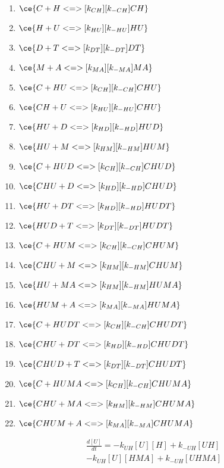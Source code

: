 \begin{enumerate}
\item $\ce{C + H <=>[k_{CH}][k_{-CH}] CH}$ %
\item $\ce{H + U <=>[k_{HU}][k_{-HU}] HU}$ %
\item $\ce{D + T <=>[k_{DT}][k_{-DT}] DT}$ %
\item $\ce{M + A <=>[k_{MA}][k_{-MA}] MA}$ %

\item $\ce{C + HU <=>[k_{CH}][k_{-CH}] CHU}$ %
\item $\ce{CH + U <=>[k_{HU}][k_{-HU}] CHU}$ %
\item $\ce{HU + D <=>[k_{HD}][k_{-HD}] HUD}$ %
\item $\ce{HU + M <=>[k_{HM}][k_{-HM}] HUM}$ %

\item $\ce{C + HUD <=>[k_{CH}][k_{-CH}] CHUD}$ %
\item $\ce{CHU + D <=>[k_{HD}][k_{-HD}] CHUD}$ %
\item $\ce{HU + DT <=>[k_{HD}][k_{-HD}] HUDT}$ %
\item $\ce{HUD + T <=>[k_{DT}][k_{-DT}] HUDT}$ %
\item $\ce{C + HUM <=>[k_{CH}][k_{-CH}] CHUM}$ %
\item $\ce{CHU + M <=>[k_{HM}][k_{-HM}] CHUM}$ %
\item $\ce{HU + MA <=>[k_{HM}][k_{-HM}] HUMA}$ %
\item $\ce{HUM + A <=>[k_{MA}][k_{-MA}] HUMA}$ %

\item $\ce{C + HUDT <=>[k_{CH}][k_{-CH}] CHUDT}$ %
\item $\ce{CHU + DT <=>[k_{HD}][k_{-HD}] CHUDT}$ %
\item $\ce{CHUD + T <=>[k_{DT}][k_{-DT}] CHUDT}$ %
\item $\ce{C + HUMA <=>[k_{CH}][k_{-CH}] CHUMA}$ %
\item $\ce{CHU + MA <=>[k_{HM}][k_{-HM}] CHUMA}$ %
\item $\ce{CHUM + A <=>[k_{MA}][k_{-MA}] CHUMA}$ %
\end{enumerate}

\begin{equation}
\begin{split}
\frac{d[U]}{dt} = - k_{UH}[U][H] + k_{-UH}[UH] \\%
                  - k_{UH}[U][HMA] + k_{-UH}[UHMA] \\%
\end{split}
\end{equation}

